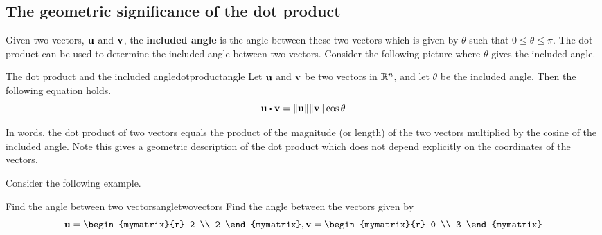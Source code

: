 \subsection{The geometric significance of the dot product}

Given two vectors, ${\bf u}$ and ${\bf v}$, the \textbf{included angle}
  is the angle between these two vectors which
is given by $\theta$ such that $0 \leq \theta \leq \pi$. The dot product can be used to
determine the included angle between two vectors. Consider the following picture where $\theta$ gives the included angle. 

\begin{center}
\end{center}

\begin{proposition}{The dot product and the included angle}{dotproductangle}
Let ${\bf u}$ and ${\bf v}$ be two vectors in $\mathbb{R}^n$, and let 
$\theta$ be the included angle. Then the following equation holds.
\begin{equation*}
\vect{u}\dotprod \vect{v}=\norm{\vect{u}} \norm{\vect{v}
} \cos \theta 
\end{equation*}
\end{proposition}

In words, the dot product of two vectors equals the product of
the magnitude (or length) of the two vectors multiplied by the cosine of the included
angle. Note this gives a geometric description of the dot product which does
not depend explicitly on the coordinates of the vectors.

Consider the following example.

\begin{example}{Find the angle between two vectors}{angletwovectors}
Find the angle between the vectors given by 
\begin{equation*}
\vect{u}
=
\begin{mymatrix}{r}
2 \\
2
\end{mymatrix}, 
\vect{v}
=
\begin{mymatrix}{r}
0 \\
3 
\end{mymatrix}
\end{equation*}
\end{example}


